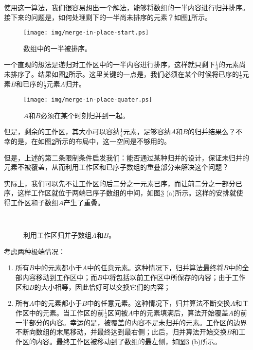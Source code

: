 \documentclass[UTF8]{article}
\begin{document}
使用这一算法，我们很容易想出一个解法，能够将数组的一半内容进行归并排序。接下来的问题是，如何处理剩下的一半尚未排序的元素？如图\ref{fig:merge-in-place-start}所示。

\begin{figure}[htbp]
 \centering
 \texttt{[image: img/merge-in-place-start.ps]}
 \caption{数组中的一半被排序。}
 \label{fig:merge-in-place-start}
\end{figure}

一个直观的想法是递归对工作区中的一半内容进行排序，这样就只剩下$\frac{1}{4}$的元素尚未排序了。结果如图\ref{fig:merge-in-place-quater}所示。这里关键的一点是，我们必须在某个时候将已序的$\frac{1}{4}$元素$B$和已序的$\frac{1}{2}$元素$A$归并。

\begin{figure}[htbp]
 \centering
 \texttt{[image: img/merge-in-place-quater.ps]}
 \caption{$A$和$B$必须在某个时刻归并到一起。}
 \label{fig:merge-in-place-quater}
\end{figure}

但是，剩余的工作区，其大小可以容纳$\frac{1}{4}$元素，足够容纳$A$和$B$的归并结果么？不幸的是，在如图\ref{fig:merge-in-place-quater}所示的布局中，这一空间是不够用的。

但是，上述的第二条限制条件启发我们：能否通过某种归并的设计，保证未归并的元素不被覆盖，从而利用工作区和已序子数组的重叠部分来解决这个问题？

实际上，我们可以先不让工作区的后二分之一元素已序，而让前二分之一部分已序，这样工作区就位于两端已序子数组的中间，如图\ref{fig:merge-in-place-setup} (a)所示。这样的安排就使得工作区和子数组$A$产生了重叠\cite{msort-in-place}。

\begin{figure}[htbp]
 \centering
  \\
 \caption{利用工作区归并子数组$A$和$B$。}
 \label{fig:merge-in-place-setup}
\end{figure}

考虑两种极端情况：

\begin{enumerate}
\item 所有$B$中的元素都小于$A$中的任意元素。这种情况下，归并算法最终将$B$中的全部内容移动到工作区中；而$B$中将包括以前工作区中所保存的内容；由于工作区和$B$的大小相等，因此恰好可以交换它们的内容；
\item 所有$A$中的元素都小于$B$中的任意元素。这种情况下，归并算法不断交换$A$和工作区中的元素。当工作区的前$\frac{1}{4}$区间被$A$中的元素填满后，算法开始覆盖$A$的前一半部分的内容。幸运的是，被覆盖的内容不是未归并的元素。工作区的边界不断向数组的末尾移动，并最终达到最右侧；此后，归并算法开始交换$B$和工作区的内容。最终工作区被移动到了数组的最左侧，如图\ref{fig:merge-in-place-setup} (b)所示。
\end{enumerate}
\end{document}
